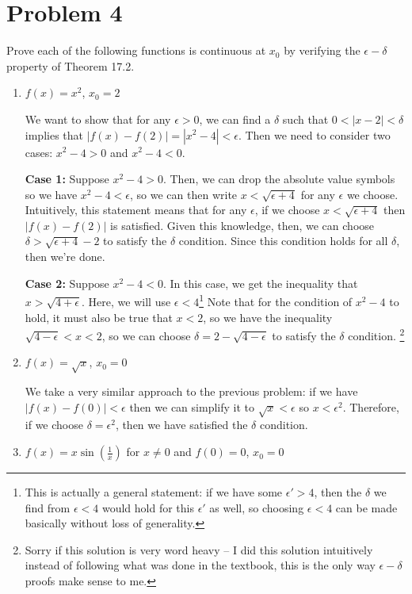 \documentclass[10pt]{article}
\begin{document}
	\section*{Problem 4}

	Prove each of the following functions is continuous at $x_0$ by verifying the $\epsilon-\delta$ property
	of Theorem 17.2.
	\begin{enumerate}[label=\alph*)]
		\item $f(x) = x^2$, $x_0 = 2$

			\begin{solution}
				We want to show that for any $\epsilon > 0$, we can find a $\delta$ such that $0 < |x - 2| < 
				\delta$ implies that $|f(x) - f(2)| = |x^2 - 4| < \epsilon$. Then we need to consider two cases:
				$x^2 - 4 > 0$ and $x^2 - 4 < 0$. 

				\textbf{Case 1:} Suppose $x^2 - 4 > 0$. Then, we can drop the absolute value symbols so we have
				$x^2 - 4 < \epsilon$, so we can then write $x < \sqrt{\epsilon +4}$ for any $\epsilon$ we choose.
				Intuitively, this statement means that for any $\epsilon$, if we choose $x < \sqrt{\epsilon +4}$
				then $|f(x) - f(2)|$ is satisfied. Given this knowledge, then, we can choose $\delta > \sqrt{
				\epsilon +4} -2$ to satisfy the $\delta$ condition. Since this condition holds for all $\delta$,
				then we're done.

				\textbf{Case 2:} Suppose $x^2 - 4 < 0$. In this case, we get the inequality that $x > \sqrt{4 + 
				\epsilon}$. Here, we will use $\epsilon < 4$\footnote{This is actually a general statement: if we
					have some $\epsilon' > 4$, then the $\delta$ we find from $\epsilon < 4$ would hold
					for this $\epsilon'$ as well, so choosing $\epsilon < 4$ can be made basically without loss
				of generality.}
				Note that for the condition of $x^2 - 4$ to hold, it must also be true that $x < 2$, so we have
				the inequality $\sqrt{4 - \epsilon} < x < 2$, so we can choose $\delta = 2 - \sqrt{4 - 
				\epsilon}$ to satisfy the $\delta$ condition.
				\footnote{Sorry if this solution is very word heavy -- I did this solution intuitively instead of following
				what was done in the textbook, this is the only way $\epsilon-\delta$ proofs make sense to me.}
			\end{solution}
		\item $f(x) = \sqrt{x}$, $x_0 = 0$

			\begin{solution}
				We take a very similar approach to the previous problem: if we have $|f(x) - f(0)| < \epsilon$ 
				then we can simplify it to $\sqrt{x} < \epsilon$ so $x < \epsilon^2$. Therefore, if we choose
				$\delta = \epsilon^2$, then we have satisfied the $\delta$ condition. 
			\end{solution}
		\item $f(x) = x \sin\left(\frac{1}{x}\right)$ for $x \neq 0$ and $f(0) = 0$, $x_0 = 0$


\end{enumerate}
\end{document}
